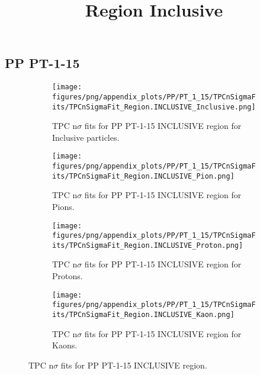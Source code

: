     
            \subsection{PP PT-1-15}
            \begin{figure}[H]
                \title{Region Inclusive}
                \begin{subfigure}[b]{0.5\textwidth}
                    \centering
                    \texttt{[image: figures/png/appendix\_plots/PP/PT\_1\_15/TPCnSigmaFits/TPCnSigmaFit\_Region.INCLUSIVE\_Inclusive.png]}
                    \caption{TPC n$\sigma$ fits for PP PT-1-15 INCLUSIVE region for Inclusive particles.}
                    \label{fig:appendix_PP_PT-1-15_INCLUSIVE_Inclusive}
                \end{subfigure}
                \begin{subfigure}[b]{0.5\textwidth}
                    \centering
                    \texttt{[image: figures/png/appendix\_plots/PP/PT\_1\_15/TPCnSigmaFits/TPCnSigmaFit\_Region.INCLUSIVE\_Pion.png]}
                    \caption{TPC n$\sigma$ fits for PP PT-1-15 INCLUSIVE region for Pions.}
                    \label{fig:appendix_PP_PT-1-15_INCLUSIVE_Pion}
                \end{subfigure}
                \begin{subfigure}[b]{0.5\textwidth}
                    \centering
                    \texttt{[image: figures/png/appendix\_plots/PP/PT\_1\_15/TPCnSigmaFits/TPCnSigmaFit\_Region.INCLUSIVE\_Proton.png]}
                    \caption{TPC n$\sigma$ fits for PP PT-1-15 INCLUSIVE region for Protons.}
                    \label{fig:appendix_PP_PT-1-15_INCLUSIVE_Proton}
                \end{subfigure}
                \begin{subfigure}[b]{0.5\textwidth}
                    \centering
                    \texttt{[image: figures/png/appendix\_plots/PP/PT\_1\_15/TPCnSigmaFits/TPCnSigmaFit\_Region.INCLUSIVE\_Kaon.png]}
                    \caption{TPC n$\sigma$ fits for PP PT-1-15 INCLUSIVE region for Kaons.}
                    \label{fig:appendix_PP_PT-1-15_INCLUSIVE_Kaon}
                \end{subfigure}
                \caption{TPC n$\sigma$ fits for PP PT-1-15 INCLUSIVE region.}
                \label{fig:appendix_PP_PT-1-15_INCLUSIVE}
            \end{figure}

